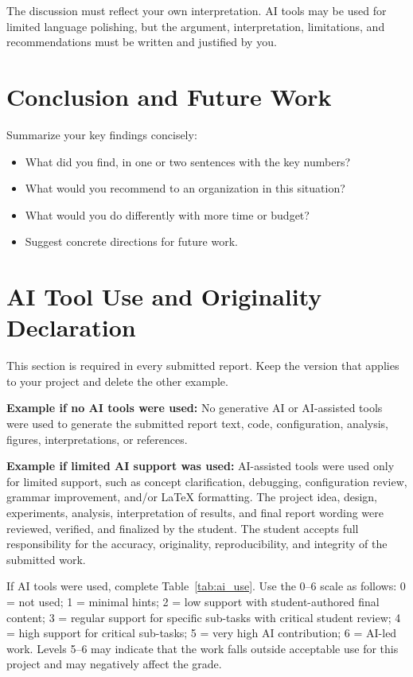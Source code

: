 \documentclass[conference,a4paper]{IEEEtran}
\begin{document}
	The discussion must reflect your own interpretation. AI tools may be used for limited language polishing, but the argument, interpretation, limitations, and recommendations must be written and justified by you.
	
	\section{Conclusion and Future Work}
	\label{sec:conclusion}
	
	Summarize your key findings concisely:
	\begin{itemize}
		\item What did you find, in one or two sentences with the key numbers?
		\item What would you recommend to an organization in this situation?
		\item What would you do differently with more time or budget?
		\item Suggest concrete directions for future work.
	\end{itemize}
	
	\section*{AI Tool Use and Originality Declaration}
	\label{sec:ai_declaration}
	
	This section is required in every submitted report. Keep the version that applies to your project and delete the other example.
	
	\textbf{Example if no AI tools were used:} No generative AI or AI-assisted tools were used to generate the submitted report text, code, configuration, analysis, figures, interpretations, or references.
	
	\textbf{Example if limited AI support was used:} AI-assisted tools were used only for limited support, such as concept clarification, debugging, configuration review, grammar improvement, and/or LaTeX formatting. The project idea, design, experiments, analysis, interpretation of results, and final report wording were reviewed, verified, and finalized by the student. The student accepts full responsibility for the accuracy, originality, reproducibility, and integrity of the submitted work.
	
	If AI tools were used, complete Table~\ref{tab:ai_use}. Use the 0--6 scale as follows: 0 = not used; 1 = minimal hints; 2 = low support with student-authored final content; 3 = regular support for specific sub-tasks with critical student review; 4 = high support for critical sub-tasks; 5 = very high AI contribution; 6 = AI-led work. Levels 5--6 may indicate that the work falls outside acceptable use for this project and may negatively affect the grade.
	
\end{document}
